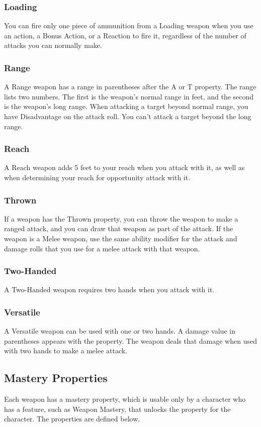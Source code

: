 \documentclass[10pt,a4paper,twoside,bg=print,twocolumn,openany,nodeprecatedcode]{dndbook}
\begin{document}
\subsubsection{Loading}
You can fire only one piece of ammunition from a Loading weapon when you use an action, a Bonus Action, or a Reaction to fire it, regardless of the number of attacks you can normally make.

\subsubsection{Range}
A Range weapon has a range in parentheses after the A or T property. The range lists two numbers. The first is the weapon's normal range in feet, and the second is the weapon's long range. When attacking a target beyond normal range, you have Disadvantage on the attack roll. You can't attack a target beyond the long range.

\subsubsection{Reach}
A Reach weapon adds 5 feet to your reach when you attack with it, as well as when determining your reach for opportunity attack with it.

\subsubsection{Thrown}
If a weapon has the Thrown property, you can throw the weapon to make a ranged attack, and you can draw that weapon as part of the attack. If the weapon is a Melee weapon, use the same ability modifier for the attack and damage rolls that you use for a melee attack with that weapon.

\subsubsection{Two-Handed}
A Two-Handed weapon requires two hands when you attack with it.

\subsubsection{Versatile}
A Versatile weapon can be used with one or two hands. A damage value in parentheses appears with the property. The weapon deals that damage when used with two hands to make a melee attack.

\subsection{Mastery Properties}
Each weapon has a mastery property, which is usable only by a character who has a feature, such as Weapon Mastery, that unlocks the property for the character. The properties are defined below.
\end{document}
